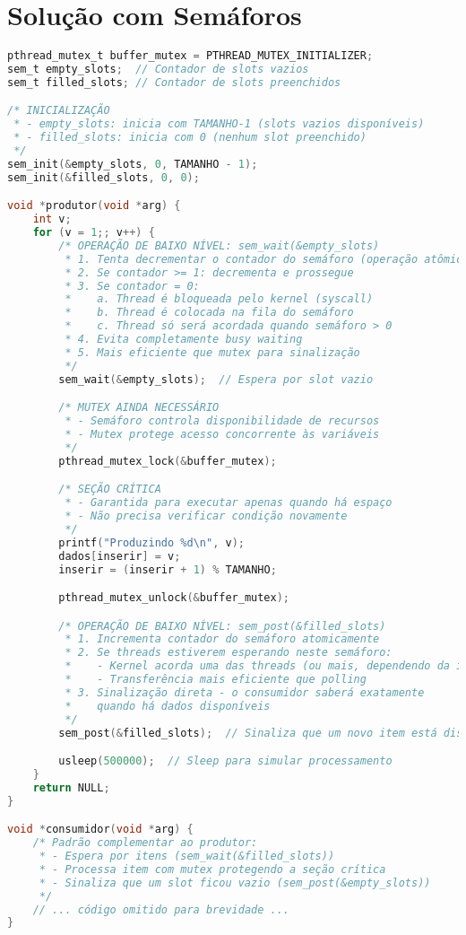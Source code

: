 \documentclass[12pt]{article}
\begin{document}
\section{Solução com Semáforos}

\begin{lstlisting}[language=C, caption=Implementação com Semáforos]
pthread_mutex_t buffer_mutex = PTHREAD_MUTEX_INITIALIZER;
sem_t empty_slots;  // Contador de slots vazios
sem_t filled_slots; // Contador de slots preenchidos

/* INICIALIZAÇÃO
 * - empty_slots: inicia com TAMANHO-1 (slots vazios disponíveis)
 * - filled_slots: inicia com 0 (nenhum slot preenchido)
 */
sem_init(&empty_slots, 0, TAMANHO - 1);
sem_init(&filled_slots, 0, 0);

void *produtor(void *arg) {
    int v;
    for (v = 1;; v++) {
        /* OPERAÇÃO DE BAIXO NÍVEL: sem_wait(&empty_slots)
         * 1. Tenta decrementar o contador do semáforo (operação atômica)
         * 2. Se contador >= 1: decrementa e prossegue
         * 3. Se contador = 0:
         *    a. Thread é bloqueada pelo kernel (syscall)
         *    b. Thread é colocada na fila do semáforo
         *    c. Thread só será acordada quando semáforo > 0
         * 4. Evita completamente busy waiting
         * 5. Mais eficiente que mutex para sinalização
         */
        sem_wait(&empty_slots);  // Espera por slot vazio

        /* MUTEX AINDA NECESSÁRIO
         * - Semáforo controla disponibilidade de recursos
         * - Mutex protege acesso concorrente às variáveis
         */
        pthread_mutex_lock(&buffer_mutex);

        /* SEÇÃO CRÍTICA
         * - Garantida para executar apenas quando há espaço
         * - Não precisa verificar condição novamente
         */
        printf("Produzindo %d\n", v);
        dados[inserir] = v;
        inserir = (inserir + 1) % TAMANHO;

        pthread_mutex_unlock(&buffer_mutex);

        /* OPERAÇÃO DE BAIXO NÍVEL: sem_post(&filled_slots)
         * 1. Incrementa contador do semáforo atomicamente
         * 2. Se threads estiverem esperando neste semáforo:
         *    - Kernel acorda uma das threads (ou mais, dependendo da impl.)
         *    - Transferência mais eficiente que polling
         * 3. Sinalização direta - o consumidor saberá exatamente
         *    quando há dados disponíveis
         */
        sem_post(&filled_slots);  // Sinaliza que um novo item está disponível

        usleep(500000);  // Sleep para simular processamento
    }
    return NULL;
}

void *consumidor(void *arg) {
    /* Padrão complementar ao produtor:
     * - Espera por itens (sem_wait(&filled_slots))
     * - Processa item com mutex protegendo a seção crítica
     * - Sinaliza que um slot ficou vazio (sem_post(&empty_slots))
     */
    // ... código omitido para brevidade ...
}
\end{lstlisting}
\end{document}
